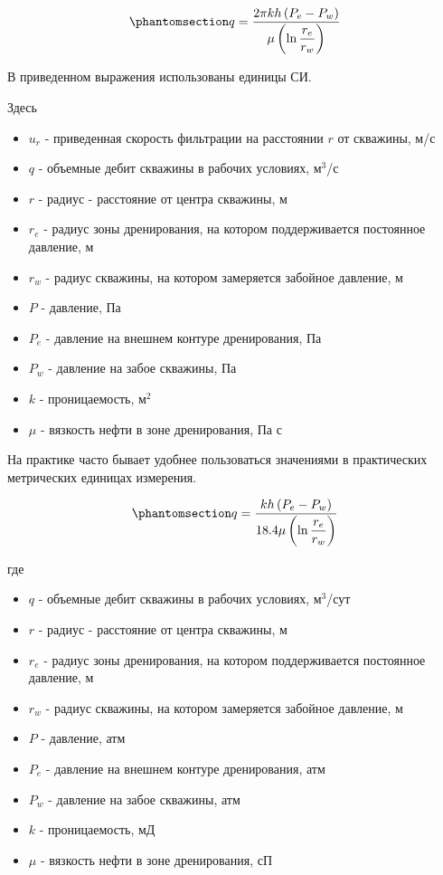 \documentclass[
  russian,
  letterpaper,
  DIV=11,
  numbers=noendperiod,
  oneside]{scrartcl}
\providecommand{\tightlist}{%
  \setlength{\itemsep}{0pt}\setlength{\parskip}{0pt}}
\begin{document}
\begin{equation}\phantomsection\label{eq-dupui_1}{ 
q=\frac{2\pi kh\left(P_e-P_w\right)}{\mu\left(\ln{\dfrac{r_e}{r_w}}\right)}
}\end{equation}

В приведенном выражения использованы единицы СИ.

Здесь

\begin{itemize}
\tightlist
\item
  \(u_r\) - приведенная скорость фильтрации на расстоянии \(r\) от
  скважины, м/с
\item
  \(q\) - объемные дебит скважины в рабочих условиях, м\(^3\)/с
\item
  \(r\) - радиус - расстояние от центра скважины, м
\item
  \(r_e\) - радиус зоны дренирования, на котором поддерживается
  постоянное давление, м
\item
  \(r_w\) - радиус скважины, на котором замеряется забойное давление, м
\item
  \(P\) - давление, Па
\item
  \(P_e\) - давление на внешнем контуре дренирования, Па
\item
  \(P_w\) - давление на забое скважины, Па
\item
  \(k\) - проницаемость, м\(^2\)
\item
  \(\mu\) - вязкость нефти в зоне дренирования, Па с
\end{itemize}

На практике часто бывает удобнее пользоваться значениями в практических
метрических единицах измерения.

\begin{equation}\phantomsection\label{eq-dupui_2}{
q=\frac{kh\left(P_e-P_w\right)}{ 18.4 \mu\left(\ln{\dfrac{r_e}{r_w}}\right)}
}\end{equation}

где

\begin{itemize}
\tightlist
\item
  \(q\) - объемные дебит скважины в рабочих условиях, м\(^3\)/сут
\item
  \(r\) - радиус - расстояние от центра скважины, м
\item
  \(r_e\) - радиус зоны дренирования, на котором поддерживается
  постоянное давление, м
\item
  \(r_w\) - радиус скважины, на котором замеряется забойное давление, м
\item
  \(P\) - давление, атм
\item
  \(P_e\) - давление на внешнем контуре дренирования, атм
\item
  \(P_w\) - давление на забое скважины, атм
\item
  \(k\) - проницаемость, мД
\item
  \(\mu\) - вязкость нефти в зоне дренирования, сП
\end{itemize}
\end{document}
